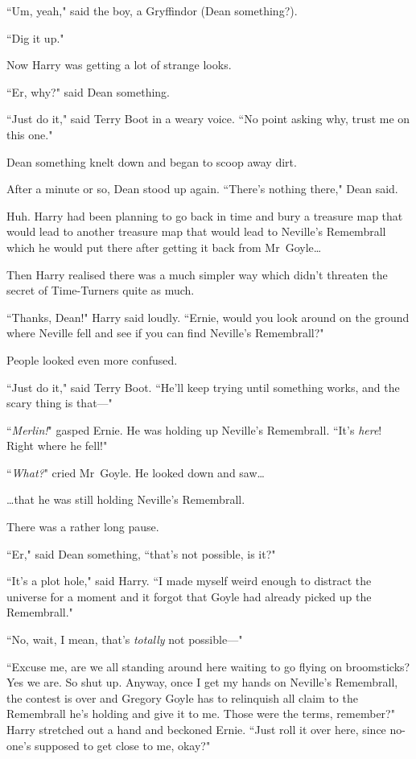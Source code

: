 ``Um, yeah," said the boy, a Gryffindor (Dean something?).

``Dig it up."

Now Harry was getting a lot of strange looks.

``Er, why?" said Dean something.

``Just do it," said Terry Boot in a weary voice. ``No point asking why, trust me on this one."

Dean something knelt down and began to scoop away dirt.

After a minute or so, Dean stood up again. ``There's nothing there," Dean said.

Huh. Harry had been planning to go back in time and bury a treasure map that would lead to another treasure map that would lead to Neville's Remembrall which he would put there after getting it back from Mr~Goyle{\ldots}

Then Harry realised there was a much simpler way which didn't threaten the secret of Time-Turners quite as much.

``Thanks, Dean!" Harry said loudly. ``Ernie, would you look around on the ground where Neville fell and see if you can find Neville's Remembrall?"

People looked even more confused.

``Just do it," said Terry Boot. ``He'll keep trying until something works, and the scary thing is that—"

``\emph{Merlin!}" gasped Ernie. He was holding up Neville's Remembrall. ``It's \emph{here}! Right where he fell!"

``\emph{What?}" cried Mr~Goyle. He looked down and saw{\ldots}

{\ldots}that he was still holding Neville's Remembrall.

There was a rather long pause.

``Er," said Dean something, ``that's not possible, is it?"

``It's a plot hole," said Harry. ``I made myself weird enough to distract the universe for a moment and it forgot that Goyle had already picked up the Remembrall."

``No, wait, I mean, that's \emph{totally} not possible—"

``Excuse me, are we all standing around here waiting to go flying on broomsticks? Yes we are. So shut up. Anyway, once I get my hands on Neville's Remembrall, the contest is over and Gregory Goyle has to relinquish all claim to the Remembrall he's holding and give it to me. Those were the terms, remember?" Harry stretched out a hand and beckoned Ernie. ``Just roll it over here, since no-one's supposed to get close to me, okay?"

